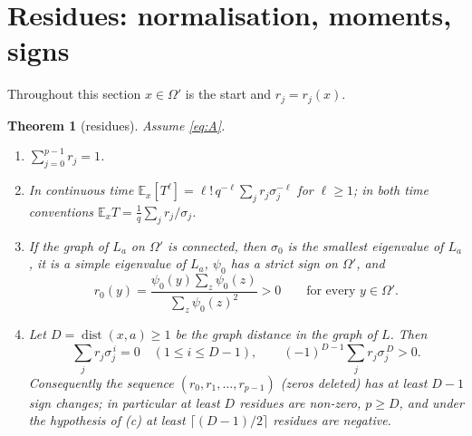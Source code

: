\documentclass[11pt,a4paper]{article}
\DeclareMathOperator{\dist}{dist}
\newcommand{\E}{\mathbb E}
\theoremstyle{plain}
\newtheorem{theorem}{Theorem}[section]
\theoremstyle{definition}
\numberwithin{equation}{section}
\begin{document}
\section{Residues: normalisation, moments, signs}\label{sec:residues}

Throughout this section $x\in\Omega'$ is the start and $r_j=r_j(x)$.

\begin{theorem}[residues]\label{thm:residues}
Assume \eqref{eq:A}.
\begin{enumerate}
\item[(a)] $\sum_{j=0}^{p-1}r_j=1$.
\item[(b)] In continuous time $\E_x[T^\ell]=\ell!\,q^{-\ell}\sum_jr_j\sigma_j^{-\ell}$ for $\ell\ge1$; in both time conventions $\E_xT=\frac1q\sum_jr_j/\sigma_j$.
\item[(c)] If the graph of $L_a$ on $\Omega'$ is connected, then $\sigma_0$ is the smallest eigenvalue of $L_a$, it is a simple eigenvalue of $L_a$, $\psi_0$ has a strict sign on $\Omega'$, and
\[
r_0(y)=\frac{\psi_0(y)\sum_{z}\psi_0(z)}{\sum_z\psi_0(z)^2}>0\qquad\text{for every }y\in\Omega' .
\]
\item[(d)] Let $D=\dist(x,a)\ge1$ be the graph distance in the graph of $L$. Then
\begin{equation}\label{eq:vanish}
\sum_jr_j\sigma_j^{\,i}=0\quad(1\le i\le D-1),\qquad (-1)^{D-1}\sum_jr_j\sigma_j^{\,D}>0 .
\end{equation}
Consequently the sequence $(r_0,r_1,\dots,r_{p-1})$ (zeros deleted) has at least $D-1$ sign changes; in particular at least $D$ residues are non-zero, $p\ge D$, and under the hypothesis of (c) at least $\lceil (D-1)/2\rceil$ residues are negative.
\end{enumerate}
\end{theorem}
\end{document}
